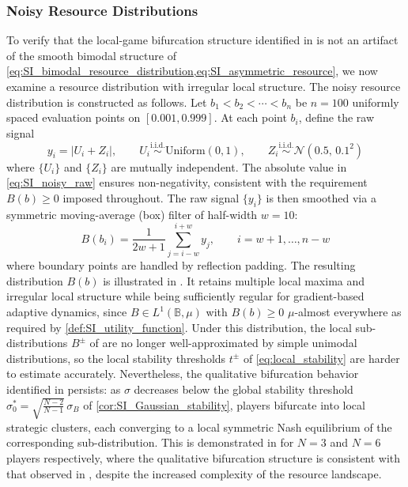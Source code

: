 \documentclass{article}
\begin{document}
                \subsubsection{Noisy Resource Distributions}\label{subsubsec:SI_noisy_bifurcation}

                To verify that the local-game bifurcation structure identified in  is not an artifact of the smooth bimodal structure of \cref{eq:SI_bimodal_resource_distribution,eq:SI_asymmetric_resource}, we now examine a resource distribution with irregular local structure. The noisy resource distribution is constructed as follows. Let $b_1 < b_2 < \cdots < b_n$ be $n = 100$ uniformly spaced evaluation points on $[0.001, 0.999]$. At each point $b_i$, define the raw signal
                \begin{equation}\label{eq:SI_noisy_raw}
                    y_i = \left|U_i + Z_i\right|, \qquad 
                    U_i \overset{\mathrm{i.i.d.}}{\sim} \mathrm{Uniform}(0,1), \qquad 
                    Z_i \overset{\mathrm{i.i.d.}}{\sim} \mathcal{N}(0.5,\, 0.1^2)
                \end{equation}
                where $\{U_i\}$ and $\{Z_i\}$ are mutually independent. The absolute value in \cref{eq:SI_noisy_raw} ensures non-negativity, consistent with the requirement $B(b) \geq 0$ imposed throughout. The raw signal $\{y_i\}$ is then smoothed via a symmetric moving-average (box) filter of half-width $w = 10$:
                \begin{equation}\label{eq:SI_noisy_smoothed}
                    B(b_i) = \frac{1}{2w+1}\sum_{j=i-w}^{i+w} y_j, \qquad i = w+1, \ldots, n-w
                \end{equation}
                where boundary points are handled by reflection padding. The resulting distribution $B(b)$ is illustrated in . It retains multiple local maxima and irregular local structure while being sufficiently regular for gradient-based adaptive dynamics, since $B \in L^1(\mathbb{B}, \mu)$ with $B(b) \geq 0$ $\mu$-almost everywhere as required by \cref{def:SI_utility_function}. Under this distribution, the local sub-distributions $B^\pm$ of  are no longer well-approximated by simple unimodal distributions, so the local stability thresholds $t^\pm$ of \cref{eq:local_stability} are harder to estimate accurately. Nevertheless, the qualitative bifurcation behavior identified in  persists: as $\sigma$ decreases below the global stability threshold $\sigma_0^* = \sqrt{\frac{N-2}{N-1}}\,\sigma_B$ of \cref{cor:SI_Gaussian_stability}, players bifurcate into local strategic clusters, each converging to a local symmetric Nash equilibrium of the corresponding sub-distribution. This is demonstrated in  for $N = 3$ and $N = 6$ players respectively, where the qualitative bifurcation structure is consistent with that observed in , despite the increased complexity of the resource landscape.
\end{document}
